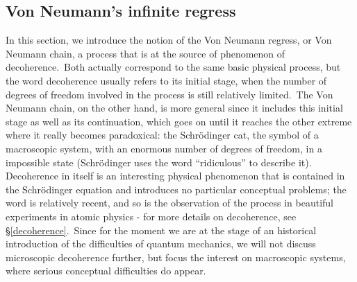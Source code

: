 \documentclass[12pt,onecolumn]{article}%
\begin{document}
\subsection{Von Neumann's infinite regress}

\label{Neumann}

In this section, we introduce the notion of the Von Neumann regress, or Von
Neumann chain, a process that is at the source of phenomenon of
decoherence.\ Both actually correspond to the same basic physical process, but
the word decoherence usually refers to its initial stage, when the number of
degrees of freedom involved in the process is still relatively limited.\ The
Von Neumann chain, on the other hand, is more general since it includes this
initial stage as well as its continuation, which goes on until it reaches the
other extreme where it really becomes paradoxical: the Schr\"{o}dinger cat,
the symbol of a macroscopic system, with an enormous number of degrees of
freedom, in a impossible state (Schr\"{o}dinger uses the word ``ridiculous''
to describe it). Decoherence in itself is an interesting physical phenomenon
that is contained in the Schr\"{o}dinger equation and introduces no particular
conceptual problems; the word is relatively recent, and so is the observation
of the process in beautiful experiments in atomic physics \cite{Brune} - for
more details on decoherence, see \S \ref{decoherence}.\ Since for the moment
we are at the stage of an historical introduction of the difficulties of
quantum mechanics, we will not discuss microscopic decoherence further, but
focus the interest on macroscopic systems, where serious conceptual
difficulties do appear.
\end{document}
